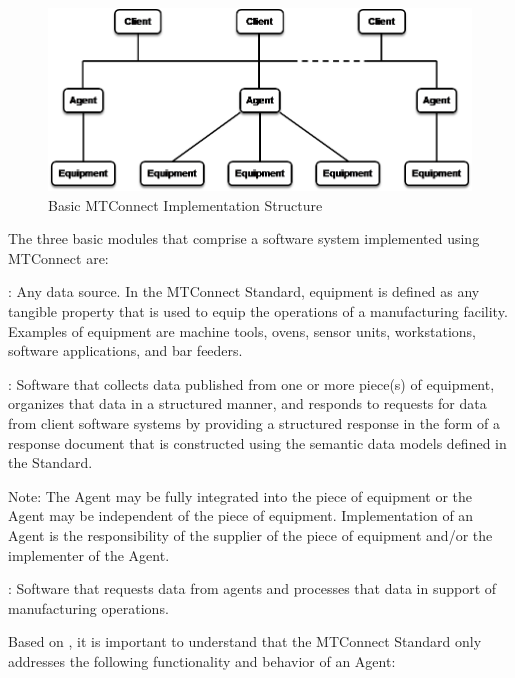 \begin{figure}[ht]
  \centering
  \includegraphics[width=1.0\textwidth]{figures/basic-mtconnect-implementation-structure.png}
  \caption{Basic MTConnect Implementation Structure}
  \label{fig:basic-mtconnect-implementation-structure}
\end{figure}

\FloatBarrier

The three basic modules that comprise a software system implemented using MTConnect are:

:  Any data source.  In the MTConnect Standard, equipment is defined as any tangible property that is used to equip the operations of a manufacturing facility.  Examples of equipment are machine tools, ovens, sensor units, workstations, software applications, and bar feeders.

:  Software that collects data published from one or more piece(s) of equipment, organizes that data in a structured manner, and responds to requests for data from client software systems by providing a structured response in the form of a \gls{response document} that is constructed using the \glspl{semantic data model} defined in the Standard. 

\begin{note}
Note:	The \gls{Agent} may be fully integrated into the piece of equipment or the \gls{Agent} may be independent of the piece of equipment.  Implementation of an \gls{Agent} is the responsibility of the supplier of the piece of equipment and/or the implementer of the \gls{Agent}.
\end{note}
    
:  Software that requests data from \glspl{agent} and processes that data in support of manufacturing operations. 

Based on , it is important to understand that the MTConnect Standard only addresses the following functionality and behavior of an \gls{Agent}:

